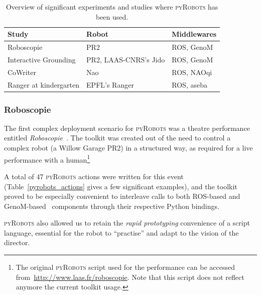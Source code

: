 \documentclass[a4paper, 10pt, conference]{ieeeconf}      %
\newcommand{\pyRobots}{\textsc{pyRobots}}
\begin{document}
\begin{table}[h]
    \centering
    \begin{tabular}{lll}
        \toprule
        Study                 & Robot & Middlewares \\ \midrule
        Roboscopie            & PR2       & ROS, {\sc GenoM} \\
        Interactive Grounding & PR2, LAAS-CNRS's Jido & ROS, {\sc GenoM} \\
        CoWriter              & Nao       & ROS, NAOqi  \\
        Ranger at kindergarten & EPFL's Ranger & ROS, aseba  \\
        \bottomrule
    \end{tabular}
    \caption{Overview of significant experiments and studies where \pyRobots{}
    has been used.}
\end{table}

\subsubsection{Roboscopie} The first complex deployment scenario for \pyRobots{} was
a theatre performance entitled \emph{Roboscopie}~\cite{lemaignan2012roboscopie}.
The toolkit was created out of the need to control a complex robot (a Willow
Garage PR2) in a structured way, as required for a live performance with a
human\footnote{The original \pyRobots{} script used for the performance can be
accessed from~\url{http://www.laas.fr/roboscopie}. Note that this script does
not reflect anymore the current toolkit usage.}

A total of 47 \pyRobots{} actions were written for this event
(Table~\ref{pyrobots_actions} gives a few significant examples), and the toolkit
proved to be especially convenient to interleave calls to both ROS-based and
{\sc GenoM}-based~\cite{mallet2010genom3} components through their respective
Python bindings.

\pyRobots{} also allowed us to retain the \emph{rapid prototyping} convenience of a
script language, essential for the robot to ``practise'' and adapt to the
vision of the director.
\end{document}
